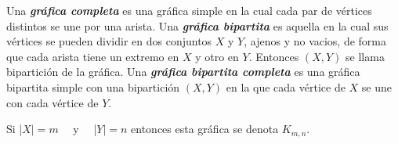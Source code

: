 Una \textbf{\textit{gr\'afica completa}} es una gr\'afica simple en la cual cada par de v\'ertices distintos se une
por una arista.
Una \textbf{\textit{gr\'afica bipartita}} es aquella en la cual sus v\'ertices se pueden dividir en dos conjuntos $X$
y $Y$, ajenos y no vacios, de forma que cada arista tiene un extremo en $X$ y otro en $Y$.
Entonces $(X,Y)$ se llama bipartici\'on de la gr\'afica.
Una \textbf{\textit{gr\'afica bipartita completa}} es una gr\'afica bipartita simple con una bipartici\'on $(X,Y)$ en
la que cada v\'ertice de $X$ se une con cada v\'ertice de $Y$.

Si \big|$X\big|=m$ \  \  y \  \  \big|$Y\big|=n$ entonces esta gr\'afica se denota $ K_{m,n}$.


\begin{figure}[ht]
    \begin{center}
\end{center}
\end{figure}
